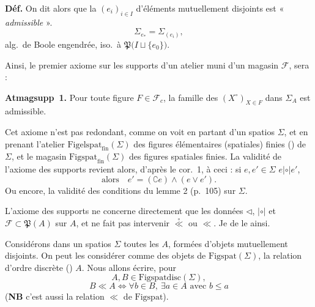 \documentclass[11pt,a4paper]{article}
\begin{document}
\textbf{Déf.} On dit alors que la \struck{\ill{}}  $(e_i)_{i \in I}$ d'éléments mutuellement disjoints est « \textit{admissible} ».
\[
  \Sigma_{e_*} = \Sigma_{(e_i)} ,
\]
alg.\ de Boole engendrée, iso.\ à $\mathfrak{P}\bigl(I \sqcup \{e_0\}\bigr)$.

Ainsi, le premier axiome sur les supports d'un atelier  muni d'un magasin \struck{\ill{}}  $\mathcal{F}$, sera  :

\textbf{Atmagsupp~1.} Pour toute figure $F \in \mathcal{F}_c$, la famille des $(X^\circ)_{X \in F}$ dans $\Sigma_A$ est admissible.

Cet axiome n'est pas redondant, comme on voit en partant d'un spatios $\Sigma$, et en prenant l'atelier $\mathrm{Figelspat}_{\mathrm{fin}}(\Sigma)$ \struck{\ill{}} des figures élémentaires (spatiales) finies () de $\Sigma$, et le magasin   $\mathrm{Figspat}_{\mathrm{fin}}(\Sigma)$ des figures spatiales finies. La validité de l'axiome des supports revient alors, d'après le cor.\ 1, à ceci : si $e, e' \in \Sigma$  $e \mathbin{|\circ|} e'$,  
\[
  \text{alors} \quad e' = (\complement e) \wedge (e \vee e') .
\]
Ou encore, la validité des conditions du lemme 2 (p.~105) sur $\Sigma$.

L'axiome des supports ne concerne directement que les données $\lhd$, $\mathbin{|\circ|}$ et $\mathcal{F} \subset \mathfrak{P}(A)$ sur $A$, et ne fait pas intervenir  $\overset{\circ}{\ll}$ ou $\ll$. Je  de le  ainsi.

Considérons dans un spatios $\Sigma$ toutes les    $A$, formées d'objets   mutuellement disjoints. On peut les considérer comme des objets de $\mathrm{Figspat}(\Sigma)$,  la relation d'ordre discrète ()  \struck{\ill{}} $A$. Nous allons écrire, pour
\[
  A, B \in \mathrm{Figspatdisc}(\Sigma) ,
\]
\[
  B \ll A \iff \forall b \in B,\ \exists a \in A \text{ avec } b \le a
\]
(\textbf{NB} c'est aussi la relation  $\ll$ de $\mathrm{Figspat}$).
\end{document}
